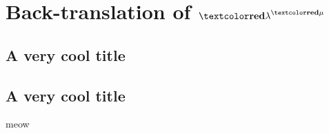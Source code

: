 \documentclass{article}
\begin{document}
\begin{smathpar}

  \sx

  \se

  \sv

  \svtwo

  \salpha

  \stypr[4]

  \sfunty{\styone}{\stytwo}

  \sfune{\sx}{\sty}{\seone}

  \sboolty

  \tfune{\tx}{\ttyone}{\teone}



  \acasee{\ae}{\ax}{\aeone}{\ay}{\aetwo}

\end{smathpar}

\renewcommand{\tlang}{\tfont{\lambda}^{\tfont{\mu}}}
\section{Back-translation of $\tlang$}
\subsection{A very cool title}
\subsection{A very cool title}


meow
\end{document}

